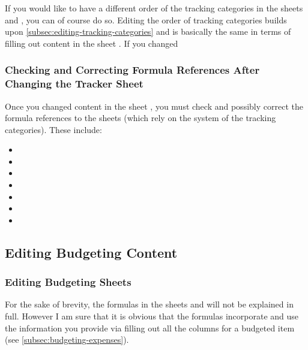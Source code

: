 If you would like to have a different order of the tracking categories in the sheets  and , you can of course do so.
Editing the order of tracking categories builds upon \autoref{subsec:editing-tracking-categories} and is basically the same in terms of filling out content in the sheet .
If you changed 

\subsubsection{Checking and Correcting Formula References After Changing the Tracker Sheet}
\label{subsubsec:checking-correcting-formula-references}

Once you changed content in the sheet , you must check and possibly correct the formula references to the sheets (which rely on the system of the tracking categories).
These include:
\begin{itemize}
	\item {}
	\item {}
	\item {}
	\item {}
	\item {}
	\item {}
	\item {}
\end{itemize}

\subsection{Editing Budgeting Content}
\label{subsec:editing-budgeting-content}

\subsubsection{Editing Budgeting Sheets}
\label{subsubsec:editing-budgeting-sheets}

For the sake of brevity,  the formulas in the sheets 	 and  will not be explained in full.
However I am sure that it is obvious that the formulas incorporate and use the information you provide via filling out all the columns for a budgeted item (see \autoref{subsec:budgeting-expenses}).



